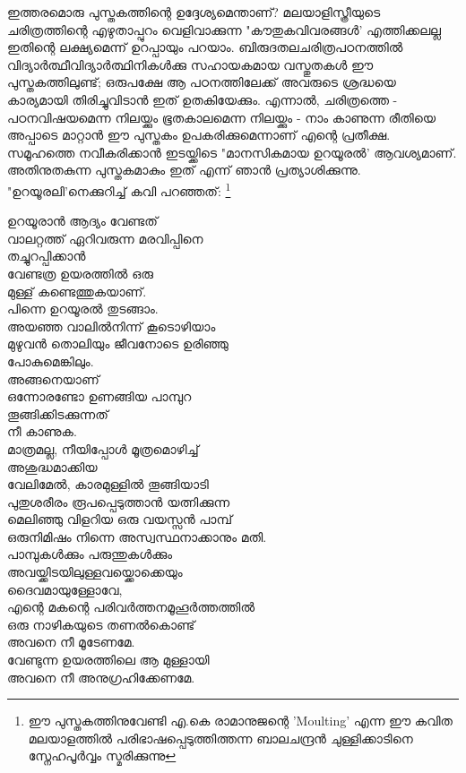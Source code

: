 ഇത്തരമൊരു പുസ്തകത്തിന്റെ ഉദ്ദേശ്യമെന്താണ്? മലയാളിസ്ത്രീയുടെ ചരിത്രത്തിന്റെ എഴുതാപ്പുറം വെളിവാക്കുന്ന "കൗതുകവിവരങ്ങൾ' എത്തിക്കലല്ല ഇതിന്റെ ലക്ഷ്യമെന്ന് ഉറപ്പായും പറയാം. ബിരുദതലചരിത്രപഠനത്തിൽ വിദ്യാർത്ഥീവിദ്യാർത്ഥിനികൾക്കു സഹായകമായ വസ്തുതകൾ ഈ പുസ്തകത്തിലുണ്ട്; ഒരുപക്ഷേ ആ പഠനത്തിലേക്ക് അവരുടെ ശ്രദ്ധയെ കാര്യമായി തിരിച്ചുവിടാൻ ഇത് ഉതകിയേക്കും. എന്നാൽ, ചരിത്രത്തെ - പഠനവിഷയമെന്ന നിലയ്ക്കും ഭൂതകാലമെന്ന നിലയ്ക്കും - നാം കാണുന്ന രീതിയെ അപ്പാടെ മാറ്റാൻ ഈ പുസ്തകം ഉപകരിക്കുമെന്നാണ് എന്റെ പ്രതീക്ഷ. സമൂഹത്തെ നവീകരിക്കാൻ ഇടയ്ക്കിടെ "മാനസികമായ ഉറയൂരൽ' ആവശ്യമാണ്. അതിനുതകുന്ന പുസ്തകമാകും ഇത് എന്ന് ഞാൻ പ്രത്യാശിക്കുന്നു. "ഉറയൂരലി'നെക്കുറിച്ച് കവി പറഞ്ഞത്:   \footnote{ഈ പുസ്തകത്തിനുവേണ്ടി എ.കെ രാമാനുജന്റെ 'Moulting' എന്ന ഈ കവിത മലയാളത്തിൽ പരിഭാഷപ്പെടുത്തിത്തന്ന ബാലചന്ദ്രൻ ചുള്ളിക്കാടിനെ സ്നേഹപൂർവ്വം സ്മരിക്കുന്നു}


\noindent
ഉറയൂരാൻ ആദ്യം വേണ്ടത്\\
വാലറ്റത്ത് ഏറിവരുന്ന മരവിപ്പിനെ\\
തച്ചുറപ്പിക്കാൻ\\
വേണ്ടത്ര ഉയരത്തിൽ ഒരു\\
മുള്ള് കണ്ടെത്തുകയാണ്.\\

\noindent
പിന്നെ ഉറയൂരൽ തുടങ്ങാം.\\
അയഞ്ഞ വാലിൽനിന്ന് കൂടൊഴിയാം\\
മുഴുവൻ തൊലിയും ജീവനോടെ ഉരിഞ്ഞു\\
പോകുമെങ്കിലും.\\
അങ്ങനെയാണ്\\
ഒന്നോരണ്ടോ ഉണങ്ങിയ പാമ്പുറ\\
തൂങ്ങിക്കിടക്കുന്നത്\\
നീ കാണുക.\\

\noindent
മാത്രമല്ല, നീയിപ്പോൾ മൂത്രമൊഴിച്ച്\\
അശുദ്ധമാക്കിയ\\
വേലിമേൽ, കാരമുള്ളിൽ തൂങ്ങിയാടി\\
പുതുശരീരം രൂപപ്പെടുത്താൻ യത്നിക്കുന്ന\\
മെലിഞ്ഞു വിളറിയ ഒരു വയസ്സൻ പാമ്പ്\\ 
ഒരുനിമിഷം നിന്നെ അസ്വസ്ഥനാക്കാനും മതി.\\

\noindent
പാമ്പുകൾക്കും പരുന്തുകൾക്കും\\
അവയ്ക്കിടയിലുള്ളവയ്ക്കൊക്കെയും\\
ദൈവമായുള്ളോവേ,\\
എന്റെ മകന്റെ പരിവർത്തനമൂഹൂർത്തത്തിൽ\\
ഒരു നാഴികയുടെ തണൽകൊണ്ട്\\
അവനെ നീ മൂടേണമേ.\\
വേണ്ടുന്ന ഉയരത്തിലെ ആ മുള്ളായി\\
അവനെ നീ അനുഗ്രഹിക്കേണമേ.\\

